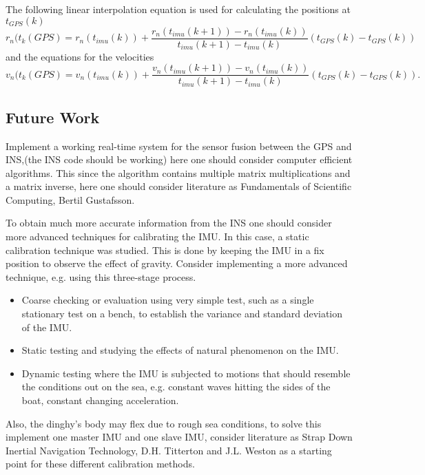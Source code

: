 The following linear interpolation equation is used for calculating the positions at $t_{GPS}(k)$
\begin{equation}
r_n(t_k(GPS) = r_n(t_{imu}(k)) + \frac{r_n(t_{imu}(k+1))-r_n(t_{imu}(k))}{t_{imu}(k+1)-t_{imu}(k)}(t_{GPS}(k)-t_{GPS}(k))
\end{equation}
 and the equations for the velocities 
 \begin{equation}
v_n(t_k(GPS) = v_n(t_{imu}(k)) + \frac{v_n(t_{imu}(k+1))-v_n(t_{imu}(k))}{t_{imu}(k+1)-t_{imu}(k)}(t_{GPS}(k)-t_{GPS}(k)).
\end{equation}


\subsection*{Future Work}
Implement a working real-time system for the sensor fusion between the GPS and INS,(the INS code should be working) here one should consider computer efficient algorithms. This since the algorithm contains multiple matrix multiplications and a matrix inverse, here one should consider literature as Fundamentals of Scientific Computing, Bertil Gustafsson.\newline

To obtain much more accurate information from the INS one should consider more advanced techniques for calibrating the IMU. In this case, a static calibration technique was studied. This is done by keeping the IMU in a fix position to observe the effect of gravity.
Consider implementing a more advanced technique, e.g. using this three-stage process.
\begin{itemize}
\item Coarse checking or evaluation using very simple test, such as a single stationary test on a bench, to establish the variance and standard deviation of the IMU.
\item Static testing and studying the effects of natural phenomenon on the IMU.
\item Dynamic testing where the IMU is subjected to motions that should resemble the conditions out on the sea, e.g. constant waves hitting the sides of the boat, constant changing acceleration.
\end{itemize}
Also, the dinghy's body may flex due to rough sea conditions, to solve this implement one master IMU and one slave IMU, consider literature as Strap Down Inertial Navigation Technology, D.H. Titterton and J.L. Weston as a starting point for these different calibration methods. \newline 


